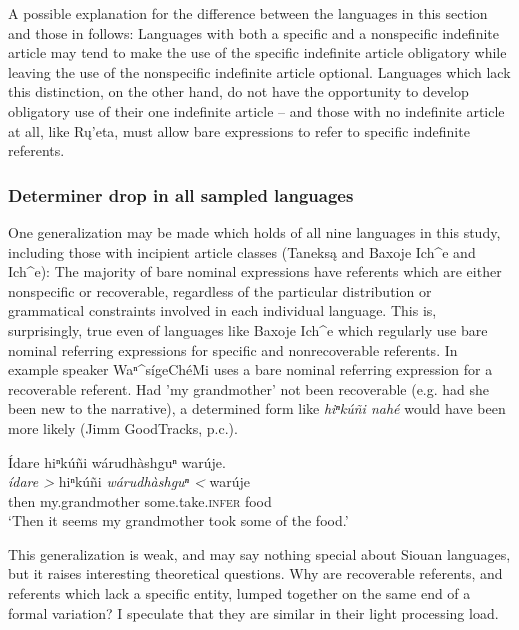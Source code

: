 \documentclass[output=paper]{LSP/langsci}
\begin{document}
A possible explanation for the difference between the languages in this section and those in  follows: Languages with both a specific and a nonspecific indefinite article may tend to make the use of the specific indefinite article obligatory while leaving the use of the nonspecific indefinite article optional. Languages which lack this distinction, on the other hand, do not have the opportunity to develop obligatory use of their one indefinite article -- and those with no indefinite article at all, like Rų’eta, must allow bare expressions to refer to specific indefinite referents.

\subsubsection{Determiner drop in all sampled languages}\label{dropsummary}

One generalization may be made which holds of all nine languages in this study, including those with incipient article classes (Taneksą and Baxoje Ich\^{}e and  Ich\^{}e): The majority of bare nominal expressions have referents which are either nonspecific or recoverable, regardless of the particular distribution or grammatical constraints involved in each individual language. This is, surprisingly, true even of languages like Baxoje Ich\^{}e which regularly use bare nominal referring expressions for specific and nonrecoverable referents. In example  speaker Waⁿ\^{}sígeChéMi uses a bare nominal referring expression for a recoverable referent. Had 'my grandmother' not been recoverable (e.g. had she been new to the narrative), a determined form like \emph{hiⁿkúñi nahé} would have been more likely (Jimm GoodTracks, p.c.).

\ea\label{wansigechemidrop}
Ídare hiⁿkúñi wárudhàshguⁿ warúje.\footnotemark\\
\gll	\emph{ídare >} 		hiⁿkúñi 				\emph{wárudhàshguⁿ <}	warúje\\
	then 				my.grandmother 			some.take.\textsc{infer}	food\\
\glt	`Then it seems my grandmother took some of the food.'
\z

This generalization is weak, and may say nothing special about Siouan languages, but it raises interesting theoretical questions. Why are recoverable referents, and referents which lack a specific entity, lumped together on the same end of a formal variation? I speculate that they are similar in their light processing load.
\end{document}

